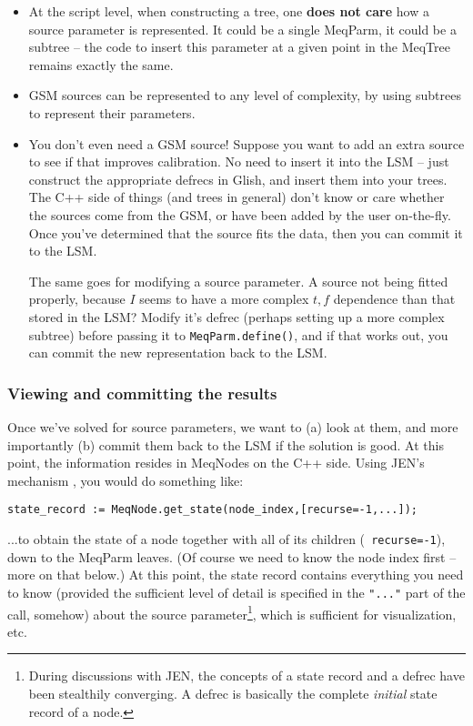 \documentclass[10pt]{article}
\begin{document}
\begin{itemize}
\item At the script level, when constructing a tree, one {\bf does not care} how
a source parameter is represented. It could be a single MeqParm, it could be a
subtree -- the code to insert this parameter at a given point in the
MeqTree remains exactly the same.

\item GSM sources can be represented to any level of complexity, by using
subtrees to represent their parameters.

\item You don't even need a GSM source! Suppose you want to add an extra source
to see if that improves calibration. No need to insert it into the LSM --  just
construct the appropriate defrecs in Glish, and insert them into your trees.
The C++ side of things (and trees in general) don't know or care whether the
sources come from the GSM, or have been added by the user on-the-fly. Once
you've determined that the source fits the data, then you can commit it to
the LSM.

The same goes for modifying a source parameter. A source not being fitted
properly, because $I$ seems to have a more complex $t,f$ dependence than that 
stored in the LSM? Modify it's defrec (perhaps setting up a more complex
subtree) before passing it to {\tt MeqParm.define()}, and if that works out,
you can commit the new representation back to the LSM. 
\end{itemize}

\subsubsection{Viewing and committing the results}

Once we've solved for source parameters, we want to (a) look at them, and more
importantly (b) commit them back to the LSM if the solution is good. At this
point, the information resides in MeqNodes on the C++ side. Using JEN's
mechanism \cite{PSS4}, you would do something like:

\begin{verbatim}
state_record := MeqNode.get_state(node_index,[recurse=-1,...]);
\end{verbatim}

...to obtain the state of a node together with all of its children ({\tt
recurse=-1}), down to the MeqParm leaves. (Of course we need to know the node
index first -- more on that below.) At this point, the state record contains
everything you need to know (provided the sufficient level of detail is
specified in the {\tt "..."} part of the call, somehow) about the source
parameter\footnote{During discussions with JEN, the concepts of a state record
and a defrec have been stealthily converging. A defrec is basically the
complete {\em initial} state record of a node.}, which is sufficient for
visualization, etc. 
\end{document}
